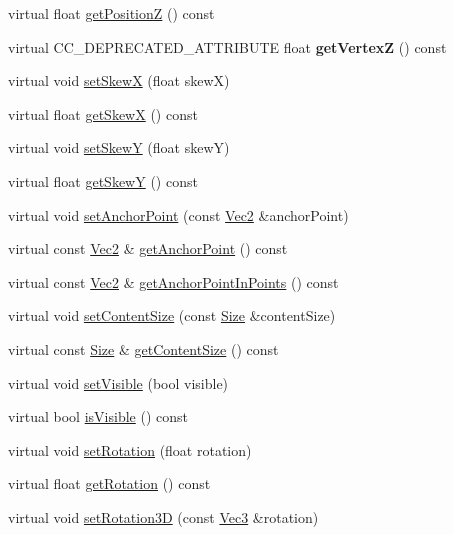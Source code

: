 \begin{Indent}
\begin{DoxyCompactItemize}
\item 
virtual float \hyperlink{classNode_a05e59f1a76dd9a1307730da7018b551b}{get\+PositionZ} () const
\item 
\mbox{\label{classNode_af9e0714dcf9b018f0bfddc4e1d48257b}} 
virtual C\+C\+\_\+\+D\+E\+P\+R\+E\+C\+A\+T\+E\+D\+\_\+\+A\+T\+T\+R\+I\+B\+U\+TE float {\bfseries get\+VertexZ} () const
\item 
virtual void \hyperlink{classNode_a237a875e4c96d5ef4286d8fa31062047}{set\+SkewX} (float skewX)
\item 
virtual float \hyperlink{classNode_adb7b2e936143dfd1622c568b2d56792b}{get\+SkewX} () const
\item 
virtual void \hyperlink{classNode_aa785fa12d35c571bac718f7b025cc684}{set\+SkewY} (float skewY)
\item 
virtual float \hyperlink{classNode_a005a75fa3bd0937f475c0846692d232f}{get\+SkewY} () const
\item 
virtual void \hyperlink{classNode_aa861dc1d80a74801ee198a7a63a58a55}{set\+Anchor\+Point} (const \hyperlink{classVec2}{Vec2} \&anchor\+Point)
\item 
virtual const \hyperlink{classVec2}{Vec2} \& \hyperlink{classNode_a38378d77548a5c7bab5370f05882bb2f}{get\+Anchor\+Point} () const
\item 
virtual const \hyperlink{classVec2}{Vec2} \& \hyperlink{classNode_a3a34e8bc876a6c391a31e8263237f844}{get\+Anchor\+Point\+In\+Points} () const
\item 
virtual void \hyperlink{classNode_af2cee4ec181c4f879e14e32c7c4b96ca}{set\+Content\+Size} (const \hyperlink{classSize}{Size} \&content\+Size)
\item 
virtual const \hyperlink{classSize}{Size} \& \hyperlink{classNode_a7f2f3f01d27d07883359139fce9d628a}{get\+Content\+Size} () const
\item 
virtual void \hyperlink{classNode_aa6dd28750fa14ef6e2ec4525c4491ad8}{set\+Visible} (bool visible)
\item 
virtual bool \hyperlink{classNode_a2595262a2b597f9d254ba6cfdae713c0}{is\+Visible} () const
\item 
virtual void \hyperlink{classNode_ad2e0cda8797b5b94398a123bfe600f21}{set\+Rotation} (float rotation)
\item 
virtual float \hyperlink{classNode_a2bd3900c64525f5b76b0ba7cd489f440}{get\+Rotation} () const
\item 
virtual void \hyperlink{classNode_ad53b989e70e96a62f2aabaa26094f4b0}{set\+Rotation3D} (const \hyperlink{classVec3}{Vec3} \&rotation)

\end{DoxyCompactItemize}
\end{Indent}
